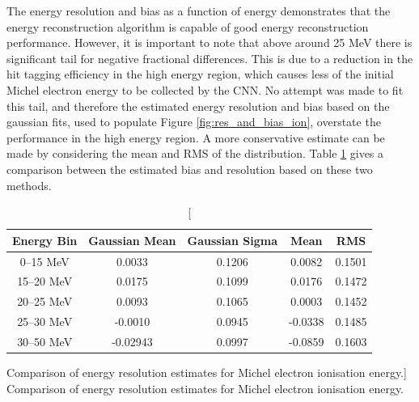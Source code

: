 The energy resolution and bias as a function of energy demonstrates that the
energy reconstruction algorithm is capable of good energy reconstruction
performance. However, it is important to note that above around 25 MeV there is
significant tail for negative fractional differences. This is due to a reduction
in the hit tagging efficiency in the high energy region, which causes less of
the initial Michel electron energy to be collected by the CNN. No attempt was
made to fit this tail, and therefore the estimated energy resolution and bias
based on the gaussian fits, used to populate Figure \ref{fig:res_and_bias_ion},
overstate the performance in the high energy region. A more conservative 
estimate can be made by considering the mean and RMS of the distribution. 
Table \ref{tab:gaus_v_mean} gives a comparison between the estimated bias and 
resolution based on these two methods.
\begin{table}
	\centering
	\bgroup
	\def\arraystretch{1.5}
	\begin{tabular}{c|c|c|c|c}
		Energy Bin & Gaussian Mean & Gaussian Sigma & Mean    & RMS    \\ \hline
		0--15 MeV  & 0.0033        & 0.1206         & 0.0082  & 0.1501 \\
		15--20 MeV & 0.0175        & 0.1099         & 0.0176  & 0.1472 \\
		20--25 MeV & 0.0093        & 0.1065         & 0.0003  & 0.1452 \\
		25--30 MeV & -0.0010       & 0.0945         & -0.0338 & 0.1485 \\
		30--50 MeV & -0.02943      & 0.0997         & -0.0859 & 0.1603 \\
	\end{tabular}
	\egroup
	\caption
	[Comparison of energy resolution estimates for Michel electron ionisation
	energy.]
	{ Comparison of energy resolution estimates for Michel electron ionisation
	energy. }
	\label{tab:gaus_v_mean}
\end{table}

